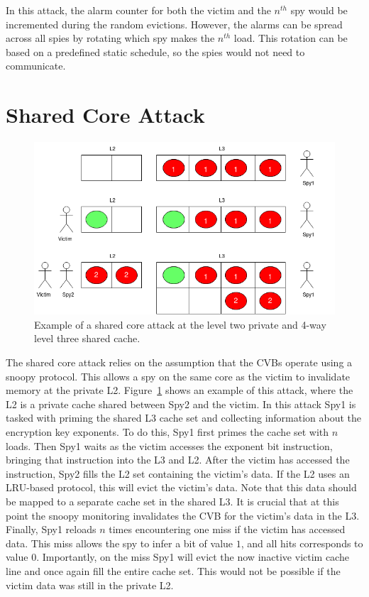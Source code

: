 \documentclass[12pt]{article}
\begin{document}
In this attack, the alarm counter for both the victim and the $n^{th}$ spy would be incremented during the random evictions.
However, the alarms can be spread across all spies by rotating which spy makes the $n^{th}$ load.
This rotation can be based on a predefined static schedule, so the spies would not need to communicate.


\section{Shared Core Attack}

\begin{figure}[h]
\centering
\includegraphics[scale=0.5]{../presentation/snd_atk.png}
\caption{Example of a shared core attack at the level two private and 4-way level three shared cache.}
\label{fig:ss}
\end{figure}

The shared core attack relies on the assumption that the CVBs operate using a snoopy protocol.
This allows a spy on the same core as the victim to invalidate memory at the private L2.
Figure~\ref{fig:ss} shows an example of this attack, where the L2 is a private cache shared between Spy2 and the victim.
In this attack Spy1 is tasked with priming the shared L3 cache set and collecting information about the encryption key exponents.
To do this, Spy1 first primes the cache set with $n$ loads.
Then Spy1 waits as the victim accesses the exponent bit instruction, bringing that instruction into the L3 and L2.
After the victim has accessed the instruction, Spy2 fills the L2 set containing the victim's data.
If the L2 uses an LRU-based protocol, this will evict the victim's data.
Note that this data should be mapped to a separate cache set in the shared L3.
It is crucial that at this point the snoopy monitoring invalidates the CVB for the victim's data in the L3.
Finally, Spy1 reloads $n$ times encountering one miss if the victim has accessed data.
This miss allows the spy to infer a bit of value $1$, and all hits corresponds to value $0$.
Importantly, on the miss Spy1 will evict the now inactive victim cache line and once again fill the entire cache set.
This would not be possible if the victim data was still in the private L2.
\end{document}
